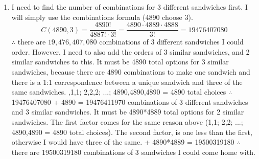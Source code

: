 \documentclass[11pt]{article}
\begin{document}
\begin{enumerate}
{\begin{enumerate}
				      	The equation to solve:
				      	\begin{eqnarray*}
				      		C(2,1)\cdot C(3,1)\cdot C(5,1)\cdot \sum\limits_{i=0}^4{C(8,i)}
				      	\end{eqnarray*}
				      	\[=30 * [C(8,0) + C(8,1) + C(8,2) + C(8,3) + C(8,4)]\]
				      	\[=30 * [1 + 8 + 28 + 56 + 70]\]
				      	\[=30 * 163=4890\]
				      	$\therefore$ there are $4890$ different sandwiches I could order.
				      	\item {
				      		      I need to find the number of combinations for 3 different sandwiches first. I will simply use the combinations formula (4890 choose 3).
				      		      \begin{equation*}
				      		      	C(4890, 3)
				      		      	=\frac{4890!}{4887!\cdot 3!}
				      		      	=\frac{4890\cdot 4889\cdot 4888}{3!}
				      		      	=19476407080
				      		      \end{equation*}
				      		      $\therefore$ there are $19,476,407,080$ combinations of 3 different sandwiches I could order.
				      		      However, I need to also add the orders of 3 similar sandwiches, and 2 similar sandwiches to this.\newline	
				      		      \newline	
				      		      It must be 4890 total options for 3 similar sandwiches, because there are 4890 combinations to make one sandwich and there is a 1:1 correspondence between a unique sandwich and three of the same sandwiches.\newline	
				      		      ,1,1; 2,2,2; ...; 4890,4890,4890 = 4890 total choices\newline	
				      		      $\therefore$ 19476407080 + 4890 = 19476411970 combinations of 3 different sandwiches and 3 similar sandwiches.\newline	
				      		      \newline	
				      		      It must be 4890*4889 total options for 2 similar sandwiches. The first factor comes for the same reason above (1,1; 2,2; ...; 4890,4890 = 4890 total choices). The second factor, is one less than the first, otherwise I would have three of the same.\newline	
				      		       + 4890*4889 = 19500319180\newline	
				      		      \newline	
				      		      $\therefore$ there are 19500319180 combinations of 3 sandwiches I could come home with.
				      		}
				      	\end{enumerate}
				      }
				      

\end{enumerate}
\end{document}
